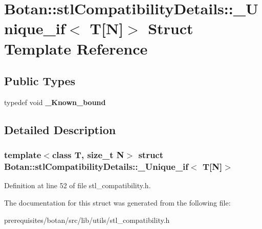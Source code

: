 \hypertarget{struct_botan_1_1stl_compatibility_details_1_1___unique__if_3_01_t[_n]_4}{}\section{Botan\+:\+:stl\+Compatibility\+Details\+:\+:\+\_\+\+Unique\+\_\+if$<$ T\mbox{[}N\mbox{]}$>$ Struct Template Reference}
\label{struct_botan_1_1stl_compatibility_details_1_1___unique__if_3_01_t[_n]_4}
\subsection*{Public Types}
\begin{DoxyCompactItemize}
\item 
\mbox{\label{struct_botan_1_1stl_compatibility_details_1_1___unique__if_3_01_t[_n]_4_a24df754773cb0d733d92ebe0adccf40f}} 
typedef void {\bfseries \+\_\+\+Known\+\_\+bound}
\end{DoxyCompactItemize}


\subsection{Detailed Description}
\subsubsection*{template$<$class T, size\+\_\+t N$>$\newline
struct Botan\+::stl\+Compatibility\+Details\+::\+\_\+\+Unique\+\_\+if$<$ T\mbox{[}\+N\mbox{]}$>$}



Definition at line 52 of file stl\+\_\+compatibility.\+h.



The documentation for this struct was generated from the following file\+:\begin{DoxyCompactItemize}
\item 
prerequisites/botan/src/lib/utils/stl\+\_\+compatibility.\+h\end{DoxyCompactItemize}
